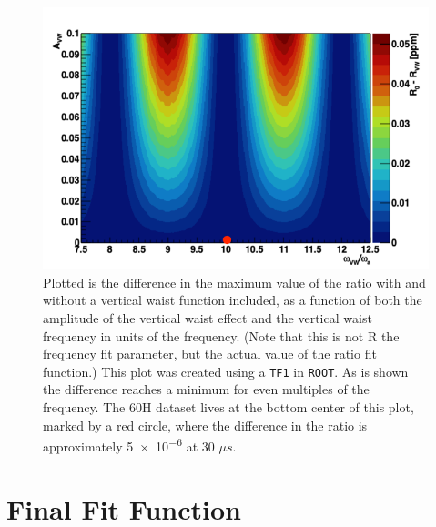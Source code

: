 	\begin{figure}[]
		\centering
		\includegraphics[width=\textwidth]{VWPlot}
	    \caption[VWPlot]{Plotted is the difference in the maximum value of the ratio with and without a vertical waist function included, as a function of both the amplitude of the vertical waist effect and the vertical waist frequency in units of the \gmtwo frequency. (Note that this is not R the frequency fit parameter, but the actual value of the ratio fit function.) This plot was created using a \texttt{TF1} in \texttt{ROOT}. As is shown the difference reaches a minimum for even multiples of the \gmtwo frequency. The 60H dataset lives at the bottom center of this plot, marked by a red circle, where the difference in the ratio is approximately \SI{5e-6}{} at 30 $\mu s$.}
	    \label{fig:VWPlot}
	\end{figure}

\clearpage

\section{Final Fit Function}
\label{Sec:FinalFitFunction}

